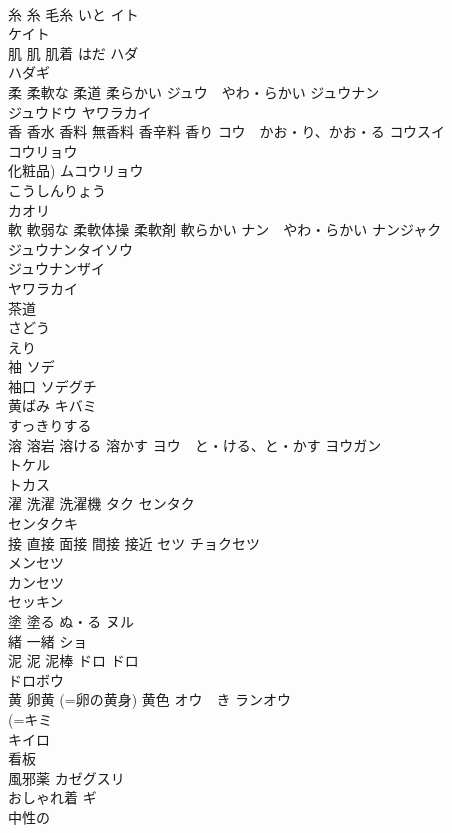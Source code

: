 \documentclass[8pt]{extreport}
\begin{document}
\begin{CJK}{UTF8}{min}
\\	糸 糸 毛糸	いと イト 
\\	ケイト 
\\	肌 肌 肌着	はだ ハダ 
\\	ハダギ 
\\	柔 柔軟な 柔道 柔らかい	ジュウ　やわ・らかい ジュウナン 
\\	ジュウドウ ヤワラカイ 
\\	香 香水 香料 無香料 香辛料 香り	コウ　かお・り、かお・る コウスイ
\\	コウリョウ 
\\	化粧品) ムコウリョウ 
\\	こうしんりょう 
\\	カオリ 
\\	軟 軟弱な 柔軟体操 柔軟剤 軟らかい	ナン　やわ・らかい ナンジャク 
\\	ジュウナンタイソウ 
\\	ジュウナンザイ 
\\	ヤワラカイ 
\\	茶道	
\\	さどう
\\	えり	
\\	袖	ソデ 
\\	袖口	ソデグチ 
\\	黄ばみ	キバミ 
\\	すっきりする	
\\	溶 溶岩 溶ける 溶かす	ヨウ　と・ける、と・かす ヨウガン 
\\	トケル 
\\	トカス 
\\	濯 洗濯 洗濯機	タク センタク 
\\	センタクキ 
\\	接 直接 面接 間接 接近	セツ チョクセツ 
\\	メンセツ 
\\	カンセツ 
\\	セッキン 
\\	塗 塗る	ぬ・る ヌル 
\\	緒 一緒	ショ 
\\	泥 泥 泥棒	ドロ ドロ 
\\	ドロボウ 
\\	黄 卵黄 (=卵の黄身) 黄色	オウ　き ランオウ 
\\	(=キミ　
\\	キイロ 
\\	看板	
\\	風邪薬	カゼグスリ 
\\	おしゃれ着	ギ 
\\	中性の	

\end{CJK}
\end{document}
